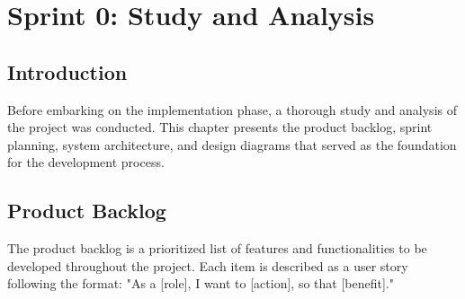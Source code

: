 \documentclass[12pt,a4paper]{report}
\begin{document}
\chapter{Sprint 0: Study and Analysis}

\section{Introduction}

Before embarking on the implementation phase, a thorough study and analysis of the project was conducted. This chapter presents the product backlog, sprint planning, system architecture, and design diagrams that served as the foundation for the development process.

\section{Product Backlog}

The product backlog is a prioritized list of features and functionalities to be developed throughout the project. Each item is described as a user story following the format: "As a [role], I want to [action], so that [benefit]."
\end{document}
